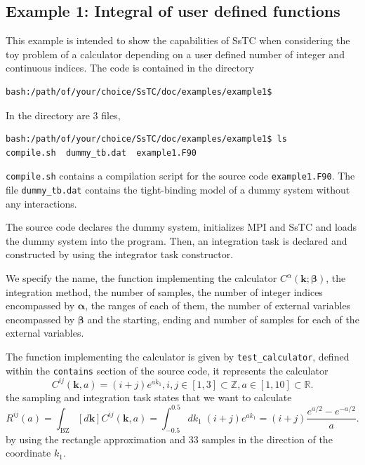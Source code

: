 \documentclass[10pt,a4paper]{article}
\begin{document}
\subsection{Example 1: Integral of user defined functions}
This example is intended to show the capabilities of SsTC when considering the toy problem of a calculator depending on a user defined number of integer and continuous indices. The code is contained in the directory
\begin{codebox}{}
\begin{verbatim}
bash:/path/of/your/choice/SsTC/doc/examples/example1$
\end{verbatim}
\end{codebox}
In the directory are 3 files,
\begin{codebox}{}
\begin{verbatim}
bash:/path/of/your/choice/SsTC/doc/examples/example1$ ls
compile.sh  dummy_tb.dat  example1.F90
\end{verbatim}
\end{codebox}
\verb|compile.sh| contains a compilation script for the source code \verb|example1.F90|. The file \verb|dummy_tb.dat| contains the tight-binding model of a dummy system  without any interactions.

The source code declares the dummy system, initializes MPI and SsTC and loads the dummy system into the program. Then, an integration task is declared and constructed by using the integrator task constructor. 

We specify the name, the function implementing the calculator $C^{\alpha}(\bm{k};\bm{\beta})$, the integration method, the number of samples, the number of integer indices encompassed by $\bm{\alpha}$, the ranges of each of them, the number of external variables encompassed by $\bm{\beta}$ and the starting, ending and number of samples for each of the external variables.

The function implementing the calculator is given by \verb|test_calculator|, defined within the \verb|contains| section of the source code, it represents the calculator
\begin{equation}
C^{ij}(\bm{k}, a) = (i + j)e^{a k_1}, i, j\in [1, 3]\subset \mathbb{Z}, a\in [1, 10]\subset \mathbb{R}.
\end{equation}
the sampling and integration task states that we want to calculate
\begin{equation}
R^{ij}(a) = \int_{\text{BZ}} \left[d\bm{k}\right]C^{ij}(\bm{k}, a) = \int_{-0.5}^{0.5} dk_1\;(i + j)e^{a k_1} = (i + j)\frac{e^{a/2}-e^{-a/2}}{a}.
\end{equation}
by using the rectangle approximation and 33 samples in the direction of the coordinate $k_1$.
\end{document}
